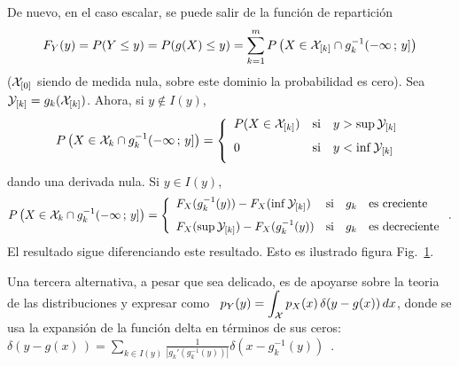 De nuevo, en el caso escalar, se puede salir de la funci\'on de repartici\'on
%
\[
F_Y(y) =  P(Y \le y) = P(  g(X) \le y )  = \sum_{k=1}^m P\left( X  \in \mathcal{X}_{[k]} \cap
  g_k^{-1}(-\infty \, ; \, y] \right)
\]
%
($\mathcal{X}_{[0]}$  siendo  de medida  nula,  sobre  este  dominio la  probabilidad  es
cero). Sea $\mathcal{Y}_{[k]} = g_k(\mathcal{X}_{[k]})$. Ahora, si $y \not\in I(y)$,
%
\[
P\left(   X   \in  \X_k   \cap   g_k^{-1}(-\infty  \,   ;   \,   y]  \right)   =
\left\{\begin{array}{lll}
%
P(X \in \X_{[k]}) & \mbox{si} & y > \sup \Y_{[k]}\\[2.5mm]
%
0 & \mbox{si} & y < \inf \Y_{[k]}\\[2.5mm]
\end{array}\right.
\]
%
dando una derivada nula. Si $y \in I(y)$,
%
\[
P\left(   X   \in  \X_k   \cap   g_k^{-1}(-\infty  \,   ;   \,   y]  \right)   =
\left\{\begin{array}{lll}
%
F_X(g_k^{-1}(y)) - F_X(\inf \Y_{[k]}) & \mbox{si} & g_k \quad \mbox{es creciente}\\[2.5mm]
%
F_X(\sup \Y_{[k]}) - F_X(g_k^{-1}(y))  & \mbox{si} & g_k \quad \mbox{es decreciente}
\end{array}\right..
\]
%
El  resultado  sigue  diferenciando  este  resultado. Esto  es  ilustrado  figura
Fig.~\ref{Fig:MP:TransformacionVA}.

\begin{figure}[h!]
\begin{center}  \end{center}
%
\label{Fig:MP:TransformacionVA}
\end{figure}

Una  tercera alternativa,  a pesar  que sea  delicado, es  de apoyarse  sobre la
teoria de las  distribuciones y expresar como \  $\displaystyle p_Y(y) = \int_{\mathcal{X}}
p_X(x) \,  \delta(y-g(x)) \, dx$,  donde se usa  la expansi\'on de  la funci\'on
delta  en  t\'erminos de  sus  ceros:  \  $\delta(y-g(x)\,)= \sum_{k  \in  I(y)}
\frac{1}{\left|      g_k'\left(      g_k^{-1}      (y)     \right)      \right|}
\delta(x-g_k^{-1}(y))$~\cite{ManWol95}.

